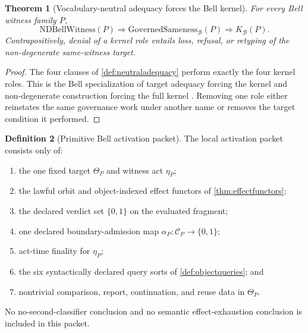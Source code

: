 \documentclass[11pt]{article}
\newtheorem{theorem}{Theorem}[section]
\theoremstyle{definition}
\newtheorem{definition}[theorem]{Definition}
\newcommand{\Bell}{\mathcal{B}}
\newcommand{\NDBell}{\mathrm{NDBellWitness}}
\newcommand{\Kbell}{K_{\Bell}}
\newcommand{\GovSame}{\mathrm{GovernedSameness}_{\Bell}}
\begin{document}
\begin{theorem}[Vocabulary-neutral adequacy forces the Bell kernel]\label{thm:adequacykernel}
For every Bell witness family $P$,
\[
\NDBell(P)\Longrightarrow\GovSame(P)\Longrightarrow\Kbell(P).
\]
Contrapositively, denial of a kernel role entails loss, refusal, or retyping of the non-degenerate same-witness target.
\end{theorem}
\begin{proof}
The four clauses of \cref{def:neutraladequacy} perform exactly the four kernel roles. This is the Bell specialization of target adequacy forcing the kernel and non-degenerate construction forcing the full kernel \cite[Lemma~2.6 and Theorem~2.34]{MaleyKernel2026}. Removing one role either reinstates the same governance work under another name or removes the target condition it performed.
\end{proof}

\begin{definition}[Primitive Bell activation packet]\label{def:activationpacket}
The local activation packet consists only of:
\begin{enumerate}[label=(H\arabic*),leftmargin=3em]
\item the one fixed target $\Theta_P$ and witness act $\eta_P$;
\item the lawful orbit and object-indexed effect functors of \cref{thm:effectfunctors};
\item the declared verdict set $\{0,1\}$ on the evaluated fragment;
\item one declared boundary-admission map $\alpha_P:\mathcal C_P\to\{0,1\}$;
\item act-time finality for $\eta_P$;
\item the six syntactically declared query sorts of \cref{def:objectqueries}; and
\item nontrivial comparison, report, continuation, and reuse data in $\Theta_P$.
\end{enumerate}
No no-second-classifier conclusion and no semantic effect-exhaustion conclusion is included in this packet.
\end{definition}
\end{document}
